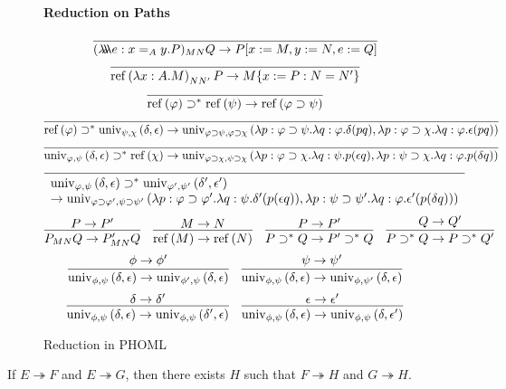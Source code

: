 \documentclass[a4paper,UKenglish]{lipics-v2016}
\newcommand*{\reff}[1]{\ensuremath{\mathrm{ref} \left( {#1} \right)}}
\newcommand*{\univ}[4]{\ensuremath{\mathrm{univ}_{{#1}, {#2}} \left({#3} , {#4} \right)}}
\newcommand*{\triplelambda}{\ensuremath{\lambda \!\! \lambda \!\! \lambda}}
\theoremstyle{plain}
\theoremstyle{definition}
\begin{document}
\begin{definition}
\begin{figure}
\paragraph*{Reduction on Paths}
$$\infer{(\triplelambda e:x =_A y.P)_{MN} Q \rightarrow P [x := M, y := N, e := Q]}{} $$
$$ \infer{\reff{\lambda x:A.M}_{N N'} P \rightarrow M \{ x:=P : N = N' \}}{} $$
$$ \infer{\reff{\varphi} \supset^* \reff{\psi} \rightarrow \reff{\varphi \supset \psi}}{} $$
$$ \infer{\reff{\varphi} \supset^* \univ{\psi}{\chi}{\delta}{\epsilon} \rightarrow 
\univ{\varphi \supset \psi}{\varphi \supset \chi}{\lambda p:\varphi \supset \psi. \lambda q : \varphi. \delta (pq)}{\lambda p : \varphi \supset \chi. \lambda q : \varphi. \epsilon (pq)}}{} $$
$$ \infer{\univ{\varphi}{\psi}{\delta}{\epsilon} \supset^* \reff{\chi} \rightarrow
\univ{\varphi \supset \chi}{\psi \supset \chi}{\lambda p : \varphi \supset \chi. \lambda q : \psi. p (\epsilon q)}{\lambda p:\psi \supset \chi. \lambda q : \varphi. p(\delta q)}}{} $$
$$ \infer{\begin{array}{l}
\univ{\varphi}{\psi}{\delta}{\epsilon} \supset^* \univ{\varphi'}{\psi'}{\delta'}{\epsilon'} \\
 \rightarrow
\univ{\varphi \supset \varphi'}{\psi \supset \psi'}{\lambda p : \varphi \supset \varphi'. \lambda q : \psi. \delta' (p(\epsilon q))}{\lambda p : \psi \supset \psi'. \lambda q : \varphi. \epsilon' (p (\delta q))}
\end{array}}{} $$
$$ \infer{P_{MN} Q \rightarrow P'_{MN} Q}{P \rightarrow P'} \quad
\infer{\reff{M} \rightarrow \reff{N}}{M \rightarrow N} \quad
\infer{P \supset^* Q \rightarrow P' \supset^* Q}{P \rightarrow P'} \quad
\infer{P \supset^* Q \rightarrow P \supset^* Q'}{Q \rightarrow Q'} $$
$$ \infer{\univ{\phi}{\psi}{\delta}{\epsilon} \rightarrow \univ{\phi'}{\psi}{\delta}{\epsilon}}{\phi \rightarrow \phi'}
\quad
\infer{\univ{\phi}{\psi}{\delta}{\epsilon} \rightarrow \univ{\phi}{\psi'}{\delta}{\epsilon}}{\psi \rightarrow \psi'} $$
$$ \infer{\univ{\phi}{\psi}{\delta}{\epsilon} \rightarrow \univ{\phi}{\psi}{\delta'}{\epsilon}}{\delta \rightarrow \delta'}
\quad
\infer{\univ{\phi}{\psi}{\delta}{\epsilon} \rightarrow \univ{\phi}{\psi}{\delta}{\epsilon'}}{\epsilon \rightarrow \epsilon'} $$
\caption{Reduction in PHOML}
\label{fig:reduction}
\end{figure}
\end{definition}

\begin{lemma}[Confluence]
\label{lm:diamond}
If $E \twoheadrightarrow F$ and $E \twoheadrightarrow G$, then there exists $H$ such that $F \twoheadrightarrow H$ and $G \twoheadrightarrow H$.
\end{lemma}
\end{document}
